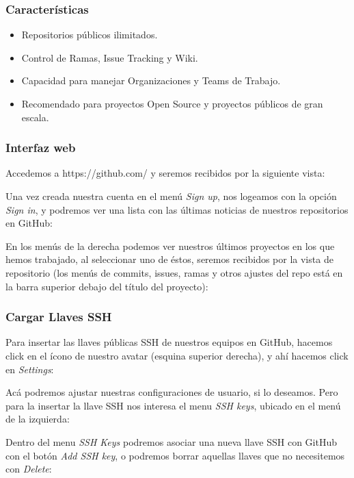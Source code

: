 \documentclass{article}
\begin{document}
\subsubsection{Características}

\begin{itemize}
\item Repositorios públicos ilimitados.
\item Control de Ramas, Issue Tracking y Wiki.
\item Capacidad para manejar Organizaciones y Teams de Trabajo.
\item Recomendado para proyectos Open Source y proyectos públicos de gran escala.
\end{itemize}

\subsubsection{Interfaz web}

Accedemos a \textsf{https://github.com/} y seremos recibidos por la siguiente vista:

Una vez creada nuestra cuenta en el menú \textit{Sign up}, nos logeamos con la opción \textit{Sign in}, y podremos ver una lista con las últimas noticias de nuestros repositorios en GitHub:

En los menús de la derecha podemos ver nuestros últimos proyectos en los que hemos trabajado, al seleccionar uno de éstos, seremos recibidos por la vista de repositorio (los menús de commits, issues, ramas y otros ajustes del repo está en la barra superior debajo del título del proyecto):

\subsubsection{Cargar Llaves SSH}

Para insertar las llaves públicas SSH de nuestros equipos en GitHub, hacemos click en el ícono de nuestro avatar (esquina superior derecha), y ahí hacemos click en \textit{Settings}:

Acá podremos ajustar nuestras configuraciones de usuario, si lo deseamos. Pero para la insertar la llave SSH nos interesa el menu \textit{SSH keys}, ubicado en el menú de la izquierda:

Dentro del menu \textit{SSH Keys} podremos asociar una nueva llave SSH con GitHub con el botón \textit{Add SSH key}, o podremos borrar aquellas llaves que no necesitemos con \textit{Delete}:
\end{document}
